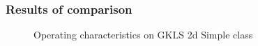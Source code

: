\documentclass[aspectratio=1610]{beamer}
\begin{document}
\begin{frame}
  \frametitle{Results of comparison}
  \begin{figure}[ht]
    \hspace*{-0.9cm}
     \hspace*{4cm}
    \caption{Operating characteristics on GKLS 2d Simple class}
  \end{figure}
\end{frame}
\end{document}

